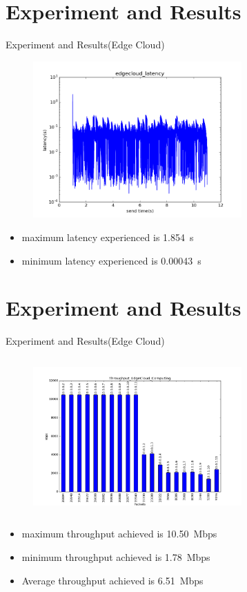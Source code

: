 \documentclass{beamer}
\begin{document}
\section{Experiment and Results}
\begin{frame}{Experiment and Results\big(Edge Cloud\big)}
\begin{figure}
\includegraphics[width=8cm, height=6cm]{edgecloudlog26}
\centering
\end{figure}
\begin{itemize}
	\item maximum latency experienced is \SI{1.854}{\second}
	\item minimum latency experienced is \SI{.00043}{\second} 
\end{itemize}

\end{frame}
\section{Experiment and Results}
\begin{frame}{Experiment and Results\big(Edge Cloud\big)}
\begin{figure}
\includegraphics[width=8cm, height=6cm]{edgecloud}
\centering
\end{figure}
\begin{itemize}

	\item maximum throughput achieved is \SI{10.50}Mbps
	\item minimum throughput achieved is \SI{1.78}Mbps
	\item Average throughput achieved is \SI{6.51}Mbps
\end{itemize}

\end{frame}
\end{document}
